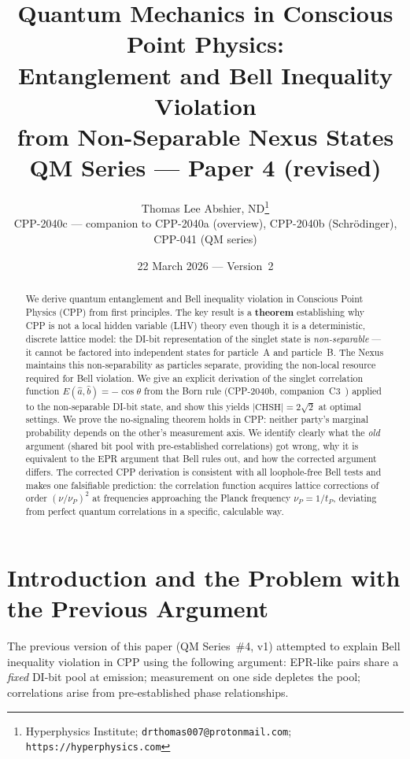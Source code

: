 \documentclass[11pt,a4paper]{article}
\title{\textbf{Quantum Mechanics in Conscious Point Physics:\\
Entanglement and Bell Inequality Violation\\
from Non-Separable Nexus States}\\[6pt]
{\large QM Series --- Paper 4 (revised)}}
\author{Thomas Lee Abshier, ND\thanks{Hyperphysics Institute;
\texttt{drthomas007@protonmail.com};
\texttt{https://hyperphysics.com}} \\
\small{CPP-2040c --- companion to CPP-2040a (overview),
CPP-2040b (Schr\"{o}dinger), CPP-041 (QM series)}}
\date{22 March 2026 --- Version~2}
\begin{document}
\maketitle

\begin{abstract}
We derive quantum entanglement and Bell inequality violation in
Conscious Point Physics (CPP) from first principles.  The key result
is a \textbf{theorem} establishing why CPP is not a local hidden
variable (LHV) theory even though it is a deterministic, discrete
lattice model: the DI-bit representation of the singlet state is
\emph{non-separable} --- it cannot be factored into independent
states for particle~A and particle~B.  The Nexus maintains this
non-separability as particles separate, providing the non-local
resource required for Bell violation.  We give an explicit derivation
of the singlet correlation function $E(\hat{a},\hat{b}) = -\cos\theta$
from the Born rule (CPP-2040b, companion~C3~\citep{abshier2026born})
applied to the non-separable DI-bit state, and show this yields
$|\mathrm{CHSH}| = 2\sqrt{2}$ at optimal settings.  We prove the
no-signaling theorem holds in CPP: neither party's marginal probability
depends on the other's measurement axis.  We identify clearly what the
\emph{old} argument (shared bit pool with pre-established correlations)
got wrong, why it is equivalent to the EPR argument that Bell rules out,
and how the corrected argument differs.  The corrected CPP derivation
is consistent with all loophole-free Bell tests and makes one
falsifiable prediction: the correlation function acquires lattice
corrections of order $(\nu/\nu_P)^2$ at frequencies approaching the
Planck frequency $\nu_P = 1/t_P$, deviating from perfect quantum
correlations in a specific, calculable way.
\end{abstract}

\tableofcontents
\newpage

\section{Introduction and the Problem with the Previous Argument}
\label{sec:intro}

The previous version of this paper (QM Series~\#4, v1) attempted to
explain Bell inequality violation in CPP using the following argument:
EPR-like pairs share a \emph{fixed} DI-bit pool at emission; measurement
on one side depletes the pool; correlations arise from pre-established
phase relationships.
\end{document}
